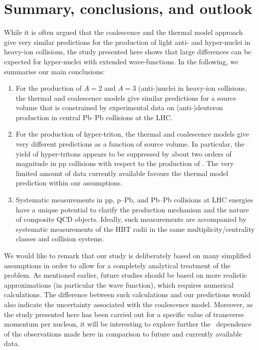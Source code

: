 \documentclass[a4paper,11pt]{scrartcl}
\begin{document}
\section{Summary, conclusions, and outlook}
While it is often argued that the coalescence and the thermal model approach give very similar predictions for the production of light anti- and hyper-nuclei in heavy-ion collisions, the study presented here shows that large differences can be expected for hyper-nuclei with extended wave-functions. In the following, we summarise our main conclusions:
\begin{enumerate}
	\item For the production of $A=2$ and $A=3$ (anti-)nuclei in heavy-ion collisions, the thermal and coalescence models give similar predictions for a source volume that is constrained by experimental data on (anti-)deuteron production in central Pb--Pb collisions at the LHC.
	\item For the production of hyper-triton, the thermal and coalescence models give very different predictions as a function of source volume. In particular, the yield of hyper-tritons appears to be suppressed by about two orders of magnitude in pp collisions with respect to the production of \hethree. The very limited amount of data currently available favours the thermal model prediction within our assumptions.
	\item Systematic measurements in pp, p--Pb, and Pb--Pb collisions at LHC energies have a unique potential to clarify the production mechanism and the nature of composite QCD objects. Ideally, such measurements are accompanied by systematic measurements of the HBT radii in the same multiplicity/centrality classes and collision systems.
\end{enumerate}

We would like to remark that our study is deliberately based on many simplified assumptions in order to allow for a completely analytical treatment of the problem. As mentioned earlier, future studies should be based on more realistic approximations (in particular the wave function), which requires numerical calculations. 
The difference between such calculations and our predictions would also indicate the uncertainty associated with the coalescence model. 
Moreover, as the study presented here has been carried out for a specific value of transverse momentum per nucleon, it will be interesting to explore further the \pt~dependence of the observations made here in comparison to future and currently available data.
\end{document}
